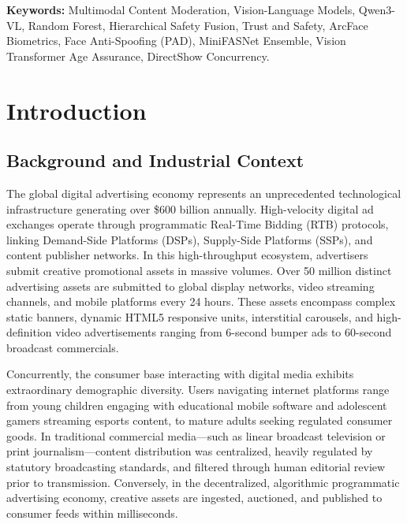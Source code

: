 \documentclass[12pt,a4paper]{report}
\begin{document}
\vspace{0.6cm}
\noindent \textbf{Keywords:} Multimodal Content Moderation, Vision-Language Models, Qwen3-VL, Random Forest, Hierarchical Safety Fusion, Trust and Safety, ArcFace Biometrics, Face Anti-Spoofing (PAD), MiniFASNet Ensemble, Vision Transformer Age Assurance, DirectShow Concurrency.


\newpage
\tableofcontents

\newpage
\listoffigures

\newpage
\listoftables

\newpage
{}
\setcounter{page}{1}


\chapter{Introduction}

\section{Background and Industrial Context}

The global digital advertising economy represents an unprecedented technological infrastructure generating over \$600 billion annually. High-velocity digital ad exchanges operate through programmatic Real-Time Bidding (RTB) protocols, linking Demand-Side Platforms (DSPs), Supply-Side Platforms (SSPs), and content publisher networks. In this high-throughput ecosystem, advertisers submit creative promotional assets in massive volumes. Over 50 million distinct advertising assets are submitted to global display networks, video streaming channels, and mobile platforms every 24 hours. These assets encompass complex static banners, dynamic HTML5 responsive units, interstitial carousels, and high-definition video advertisements ranging from 6-second bumper ads to 60-second broadcast commercials.

Concurrently, the consumer base interacting with digital media exhibits extraordinary demographic diversity. Users navigating internet platforms range from young children engaging with educational mobile software and adolescent gamers streaming esports content, to mature adults seeking regulated consumer goods. In traditional commercial media---such as linear broadcast television or print journalism---content distribution was centralized, heavily regulated by statutory broadcasting standards, and filtered through human editorial review prior to transmission. Conversely, in the decentralized, algorithmic programmatic advertising economy, creative assets are ingested, auctioned, and published to consumer feeds within milliseconds.
\end{document}
